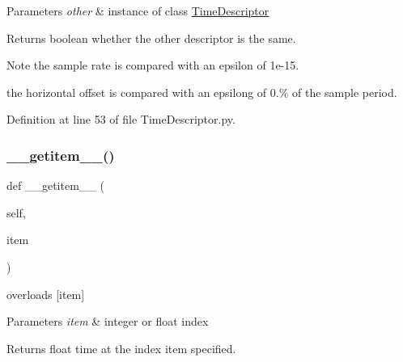 \begin{DoxyParams}{Parameters}
{\em other} & instance of class \hyperlink{classSignalIntegrity_1_1TimeDomain_1_1Waveform_1_1TimeDescriptor_1_1TimeDescriptor}{Time\+Descriptor} \\
\hline
\end{DoxyParams}
\begin{DoxyReturn}{Returns}
boolean whether the other descriptor is the same. 
\end{DoxyReturn}
\begin{DoxyNote}{Note}
the sample rate is compared with an epsilon of 1e-\/15. 

the horizontal offset is compared with an epsilong of 0.\% of the sample period. 
\end{DoxyNote}


Definition at line 53 of file Time\+Descriptor.\+py.

\mbox{\label{classSignalIntegrity_1_1TimeDomain_1_1Waveform_1_1TimeDescriptor_1_1TimeDescriptor_aab91ae2e037c39b631a69273c277bfe9}} 
\subsubsection{\texorpdfstring{\+\_\+\+\_\+getitem\+\_\+\+\_\+()}{\_\_getitem\_\_()}}
{\footnotesize\ttfamily def \+\_\+\+\_\+getitem\+\_\+\+\_\+ (\begin{DoxyParamCaption}\item[{}]{self,  }\item[{}]{item }\end{DoxyParamCaption})}



overloads \mbox{[}item\mbox{]} 


\begin{DoxyParams}{Parameters}
{\em item} & integer or float index \\
\hline
\end{DoxyParams}
\begin{DoxyReturn}{Returns}
float time at the index item specified. 
\end{DoxyReturn}


